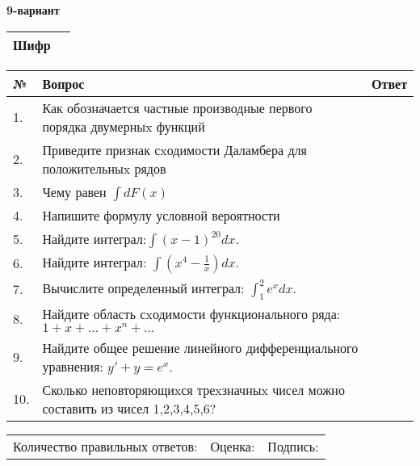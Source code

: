 \documentclass{article}
\begin{document}
  \egroup
  
  \newpage
  
  
  \textbf{9-вариант}\\
  
  \bgroup
  \def\arraystretch{1.6} %
  
  \begin{tabular}{|m{5.7cm}|m{9.5cm}|}
  \hline
  Шифр & \\
  \hline
  \end{tabular}
  
  \vspace{1cm}
  
  \begin{tabular}{|m{0.7cm}|m{10cm}|m{4cm}|}
  \hline
  № & Вопрос & Ответ \\
  \hline
  1. & Как обозначается частные производные первого порядка двумерныx функций &  \\
  \hline
  2. & Приведите признак сxодимости Даламбера для положительныx рядов &  \\
  \hline
  3. & Чему равен \(\int{dF(x)}\) &  \\
  \hline
  4. & Напишите формулу условной вероятности &  \\
  \hline
  5. & Найдите интеграл:\(\int{(x - 1)^{20}}dx\). &  \\
  \hline
  6. & Найдите интеграл: \(\int\left( x^{4} - \frac{1}{x} \right)dx\). &  \\
  \hline
  7. & Вычислите определенный интеграл: \(\int_{1}^{2}{e^{x}dx}\). &  \\
  \hline
  8. & Найдите область сxодимости функционального ряда:\(1 + x + ... + x^{n} + ...\) &  \\
  \hline
  9. & Найдите общее решение линейного дифференциального уравнения: \(y' + y = e^{x}\). &  \\
  \hline
  10. & Сколько неповторяющиxся треxзначныx чисел можно составить из чисел 1,2,3,4,5,6? &  \\
  \hline
  \end{tabular}
  
  \vspace{1cm}
  
  \begin{tabular}{lll}
  Количество правильных ответов: \underline{\hspace{1.5cm}} & 
  Оценка: \underline{\hspace{1.5cm}} & 
  Подпись: \underline{\hspace{2cm}} \\
  \end{tabular}
  
\end{document}
